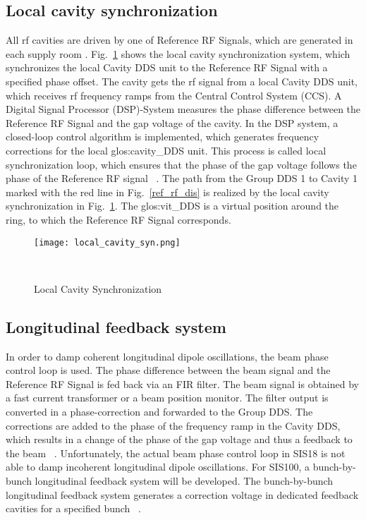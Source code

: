 \subsection{Local cavity synchronization}
All rf cavities are driven by one of Reference RF Signals, which are generated in each supply room . Fig.~\ref{local_cavity_syn} shows the local cavity synchronization system, which synchronizes the local Cavity DDS unit to the Reference RF Signal with a specified phase offset. The cavity gets the rf signal from a local Cavity \gls{DDS} unit, which receives rf frequency ramps from the Central Control System (\gls{CCS}). A Digital Signal Processor (\gls{DSP})-System measures the phase difference between the Reference RF Signal and the gap voltage of the cavity. In the DSP system, a closed-loop control algorithm is implemented, which generates frequency corrections for the local \gls{glos:cavity_DDS} unit. This process is called local synchronization loop, which ensures that the phase of the gap voltage follows the phase of the Reference RF signal ~\cite{klingbeil_new_2011}. The path from the Group DDS 1 to Cavity 1 marked with the red line in Fig.~\ref{ref_rf_dis} is realized by the local cavity synchronization in Fig.~\ref{local_cavity_syn}. The \gls{glos:vit_DDS} is a virtual position around the ring, to which the Reference RF Signal corresponds.
\begin{figure}[H]
   \centering   
   \texttt{[image: local\_cavity\_syn.png]}
   \caption{Local Cavity Synchronization}{~\cite{klingbeil_new_2011}}
   \label{local_cavity_syn}
\end{figure}
\subsection{Longitudinal feedback system}
In order to damp coherent longitudinal dipole oscillations, the beam phase control loop is used. The phase difference between the beam signal and the Reference RF Signal is fed back via an FIR filter. The beam signal is obtained by a fast current transformer or a beam position monitor. The filter output is converted in a phase-correction and forwarded to the Group DDS. The corrections are added to the phase of the  frequency ramp in the Cavity DDS, which results in a change of the phase of the gap voltage and thus a feedback to the beam ~\cite{baudrenghien_low-level_2010}. Unfortunately, the actual beam phase control loop in SIS18 is not able to damp incoherent longitudinal dipole oscillations. For SIS100, a bunch-by-bunch longitudinal feedback system will be developed. The bunch-by-bunch longitudinal feedback system generates a correction voltage in dedicated feedback cavities for a specified bunch ~\cite{gross_bunch-by-bunch_2015}. 

